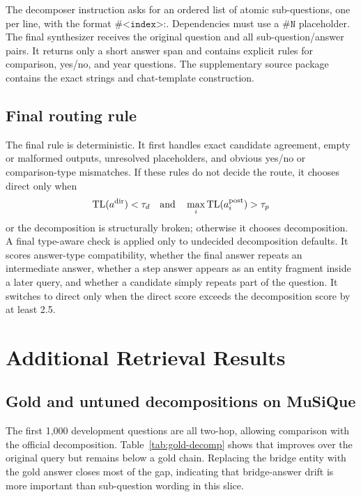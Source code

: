 The decomposer instruction asks for an ordered list of atomic sub-questions,
one per line, with the format \(\texttt{\#<index>:}\). Dependencies must use a
\(\texttt{\#N}\) placeholder. The final synthesizer receives the original
question and all sub-question/answer pairs. It returns only a short answer span
and contains explicit rules for comparison, yes/no, and year questions. The
supplementary source package contains the exact strings and chat-template
construction.

\subsection{Final routing rule}

The final rule is deterministic. It first handles exact candidate agreement,
empty or malformed outputs, unresolved placeholders, and obvious yes/no or
comparison-type mismatches. If these rules do not decide the route, it chooses
direct only when
\[
 \mathrm{TL}(a^{\mathrm{dir}})<\tau_d
 \quad\text{and}\quad
 \max_i\mathrm{TL}(a_i^{\mathrm{post}})>\tau_p
\]
or the decomposition is structurally broken; otherwise it chooses
decomposition. A final type-aware check is applied only to undecided
decomposition defaults. It scores answer-type compatibility, whether the final
answer repeats an intermediate answer, whether a step answer appears as an
entity fragment inside a later query, and whether a candidate simply repeats
part of the question. It switches to direct only when the direct score exceeds
the decomposition score by at least 2.5.

\section{Additional Retrieval Results}
\label{app:additional-results}

\subsection{Gold and untuned decompositions on MuSiQue}

The first 1,000 \musique{} development questions are all two-hop, allowing
comparison with the official decomposition. Table~\ref{tab:gold-decomp}
shows that \method{} improves over the original query but remains below a gold
chain. Replacing the bridge entity with the gold answer closes most of the gap,
indicating that bridge-answer drift is more important than sub-question wording
in this slice.

